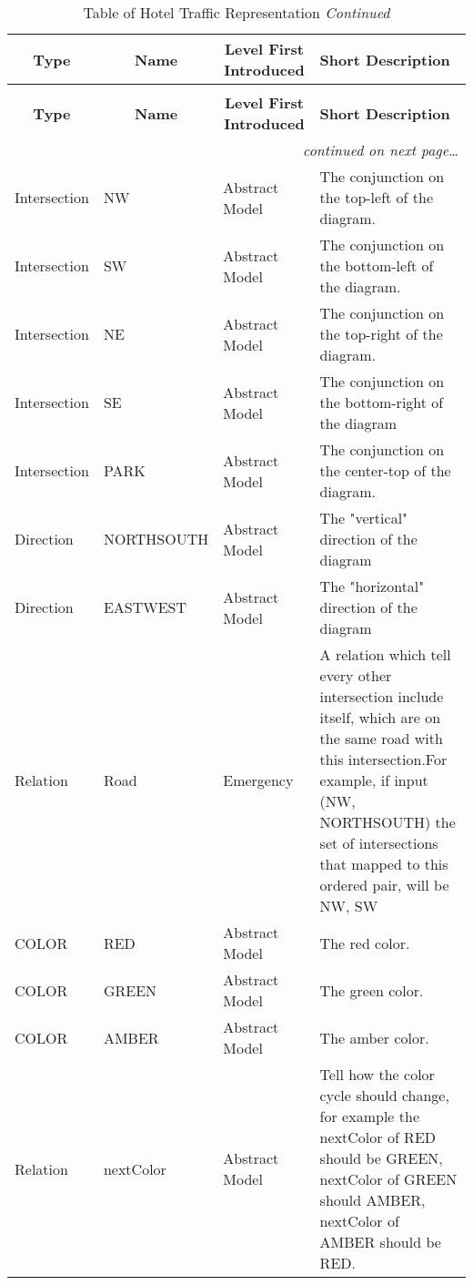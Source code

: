 \documentclass[a4paper]{article}
\begin{document}
\begin{longtable}{|l|p{2.4cm}|p{4.1cm}|p{4.5cm}|}
  \caption{Table of Hotel Traffic Entity Representation}\\
  \hline
  \multicolumn{1}{|c|}{\textbf{Type}}  &
  \multicolumn{1}{|c|}{\textbf{Name}} &
  \multicolumn{1}{|c|}{\textbf{Level First Introduced}} &
  \textbf{Short Description}\\
  \hline\hline
  \endfirsthead
  \caption[]{Table of Hotel Traffic Representation \textit{Continued}}\\
  \hline
  \multicolumn{1}{|c|}{\textbf{Type}}  &
  \multicolumn{1}{|c|}{\textbf{Name}} &
  \multicolumn{1}{|c|}{\textbf{Level First Introduced}} &
  \textbf{Short Description}\\
  \hline\hline
  \endhead
  \hline
  \multicolumn{4}{r}{\textit{continued on next page\ldots}}\\
  \endfoot
  \hline
  \endlastfoot
   Intersection & NW & Abstract Model &The conjunction on the top-left of the diagram.\\
   \hline
   Intersection & SW & Abstract Model &The conjunction on the bottom-left of the diagram.\\
   \hline
    Intersection & NE & Abstract Model &The conjunction on the top-right of the diagram.\\
   \hline
   Intersection & SE & Abstract Model &The conjunction on the bottom-right of the diagram\\
   \hline
   Intersection & PARK & Abstract Model & The conjunction on the center-top of the diagram.\\
   \hline
   Direction & NORTHSOUTH & Abstract Model & The "vertical" direction of the diagram\\
   \hline
   Direction & EASTWEST & Abstract Model & The "horizontal" direction of the diagram\\
   \hline
   Relation & Road & Emergency & A relation which tell every other intersection include itself, which are on the same road with this intersection.\linebreak\linebreak For example, if input (NW, NORTHSOUTH) the set of intersections that mapped to this ordered pair, will be {NW, SW}\\
   \hline
   COLOR & {\color{red}RED} & Abstract Model & The {\color{red}red} color.\\
   \hline
    COLOR & {\color{green}GREEN} & Abstract Model & The {\color{green}green} color.\\
   \hline
    COLOR & {\color{yellow}AMBER} & Abstract Model & The {\color{yellow}amber} color.\\
   \hline
   Relation & nextColor & Abstract Model & Tell how the color cycle should change, for example the nextColor of RED should be GREEN, nextColor of GREEN should AMBER, nextColor of AMBER should be RED.
\end{longtable}
\end{document}
